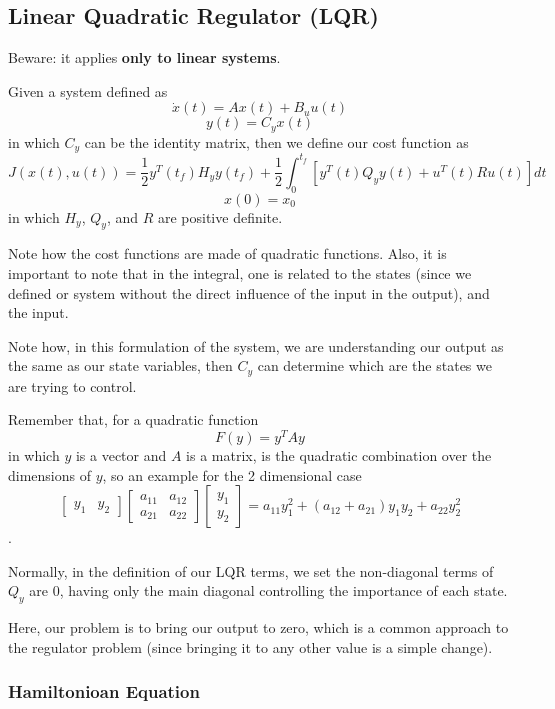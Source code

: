 \subsection*{Linear Quadratic Regulator (LQR)}

Beware: it applies \textbf{only to linear systems}.

Given a system defined as \[
    \dot{x}(t) = Ax(t) + B_u u(t)
\] \[
y(t) = C_y x(t)
\] in which $C_y$ can be the identity matrix, then we define our cost function as \[
J(x(t), u(t)) = \frac{1}{2}y^T(t_f)H_yy(t_f) + \frac{1}{2}\int_{0}^{t_f}\left[ y^{T}(t)Q_yy(t) + u^T(t)Ru(t) \right] dt
\] \[
x(0) = x_0
\]  in which $H_y$, $Q_y$, and $R$ are positive definite.

Note how the cost functions are made of quadratic functions. Also, it is important to note that in the integral, one is related to the states (since we defined or system without the direct influence of the input in the output), and the input.

Note how, in this formulation of the system, we are understanding our output as the same as our state variables, then $C_y$ can determine which are the states we are trying to control.

Remember that, for a quadratic function \[
    F(y) = y^TAy
\] in which $y$ is a vector and $A$ is a matrix, is the quadratic combination over the dimensions of $y$, so an example for the 2 dimensional case \[
\begin{bmatrix} y_{1} & y_2 \end{bmatrix} \begin{bmatrix} a_{11} & a_{12} \\ a_{21} & a_{22} \end{bmatrix} \begin{bmatrix} y_1\\ y_2 \end{bmatrix} = a_{11}y_1^{2}+(a_{12} + a_{21})y_1y_2 + a_{22}y_2^{2}
\] .

Normally, in the definition of our LQR terms, we set the non-diagonal terms of $Q_y$ are $0$, having only the main diagonal controlling the importance of each state.

Here, our problem is to bring our output to zero, which is a common approach to the regulator problem (since bringing it to any other value is a simple change).

\subsubsection*{Hamiltonioan Equation}

